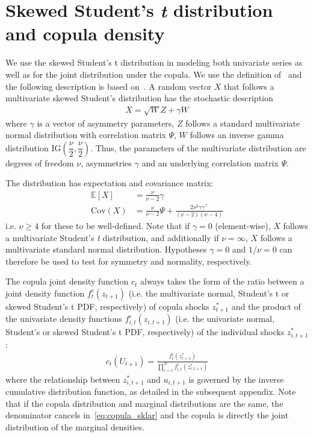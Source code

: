 
\section{Skewed Student's \emph{t} distribution and copula density} %
\label{app:ghstmv}

We use the skewed Student's t distribution in modeling both univariate series as well as for the joint distribution under the copula. We use the definition of~\textcite{Hansen1994} and the following description is based on~\textcite{ChristoffersenLanglois2013}. A random vector $X$ that follows a multivariate skewed Student's distribution has the stochastic description
\begin{align}
  X = \sqrt{W}Z + \gamma W
\end{align}
where $\gamma$ is a vector of asymmetry parameters, $Z$ follows a standard multivariate normal distribution with correlation matrix $\Psi$, $W$ follows an inverse gamma distribution $\text{IG}(\dfrac{\nu}{2}, \dfrac{\nu}{2})$. Thus, the parameters of the multivariate distribution are degrees of freedom $\nu$, asymmetries $\gamma$ and an underlying correlation matrix $\Psi$.

The distribution has expectation and covariance matrix:
\begin{align}
  \mathbb{E}[X] &= \frac{\nu}{\nu - 2} \gamma \\
  \text{Cov}(X) &=
    \frac{\nu}{\nu - 2} \Psi +
    \frac{2 \nu^2 \gamma \gamma^\top}{(\nu - 2)(\nu - 4)}
\end{align}
i.e. $\nu \geq 4$ for these to be well-defined. Note that if $\gamma = 0$ (element-wise), $X$ follows a multivariate Student's \emph{t} distribution, and additionally if $\nu = \infty$, $X$ follows a multivariate standard normal distribution. Hypotheses $\gamma = 0$ and $1/\nu = 0$ can therefore be used to test for symmetry and normality, respectively.


The copula joint density function $c_t$ always takes the form of the ratio between a joint density function $f^c_{t}(z_{t+1})$ (i.e. the multivariate normal, Student's t or skewed Student's t PDF, respectively) of copula shocks $z_{t+1}^*$ and the product of the univariate density functions $f^c_{i,t}(z_{i,t+1})$ (i.e. the univariate normal, Student's or skewed Student's t PDF, respectively) of the individual shocks $z_{i,t+1}^*$:
\begin{align}
  c_t(U_{t+1}) = 
    \frac{f^c_t(z^*_{t+1})}{\prod_{i=1}^N f^c_{i,t}(z^*_{i,t+1})}
\end{align}
where the relationship between $z^*_{i,t+1}$ and $u_{i,t+1}$ is governed by the inverse cumulative distribution function, as detailed in the subsequent appendix. Note that if the copula distribution and marginal distributions are the same, the denominator cancels in~\autoref{eq:copula_sklar} and the copula is directly the joint distribution of the marginal densities.

